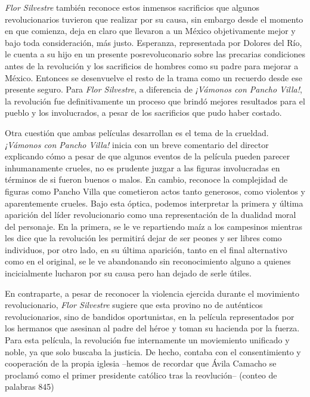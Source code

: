 \textit{Flor Silvestre} también reconoce estos inmensos sacrificios que algunos revolucionarios tuvieron que realizar por su causa, sin embargo desde el momento en que comienza, deja en claro que llevaron a un México objetivamente mejor y bajo toda consideración,  más justo.%
Esperanza, representada por Dolores del Río, le cuenta a su hijo en un presente posrevoluconario sobre las precarias condiciones antes de la revolución y los sacrificios de hombres como su padre para mejorar a México. Entonces se desenvuelve el resto de la trama como un recuerdo desde ese presente seguro. Para \textit{Flor Silvestre}, a diferencia de \textit{¡Vámonos con Pancho Villa!}, la revolución fue definitivamente un proceso que brindó mejores resultados para el pueblo y los involucrados, a pesar de los sacrificios que pudo haber costado. 

Otra cuestión que ambas películas desarrollan es el tema de la crueldad. \textit{¡Vámonos con Pancho Villa!} inicia con un breve comentario del director explicando cómo a pesar de que algunos eventos de la película pueden parecer inhumanamente crueles, no es prudente juzgar a las figuras involucradas en términos de si fueron buenos o malos. 
En cambio, reconoce la complejidad de figuras como Pancho Villa que cometieron actos tanto generosos, como violentos y aparentemente crueles.
Bajo esta óptica, podemos interpretar la primera y última aparición del líder revolucionario como una representación de la dualidad moral del personaje. En la primera, se le ve repartiendo maíz a los campesinos mientras les dice que la revolución les permitirá dejar de ser peones y ser libres como individuos, por otro lado, en su última aparición, tanto en el final alternativo como en el original, se le ve abandonando  sin reconocimiento alguno a quienes incicialmente lucharon por su causa pero han dejado de serle útiles.

En contraparte, a pesar de reconocer la violencia ejercida durante el movimiento revolucionario, \textit{Flor Silvestre } sugiere que esta provino no de auténticos revolucionarios, sino de bandidos oportunistas, en la película representados por los hermanos que asesinan al padre del héroe y toman su hacienda por la fuerza. Para esta película, la revolución fue internamente un moviemiento unificado y noble, ya que solo buscaba la justicia. De hecho, contaba con el consentimiento y cooperación de la propia iglesia --hemos de recordar que Ávila Camacho se proclamó como el primer presidente católico tras la reovlución--%
(conteo de palabras 845)
